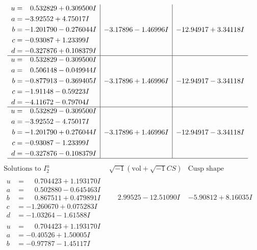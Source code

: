 \documentclass[1p]{elsarticle_modified}
\theoremstyle{definition}
\newcommand{\I}{\sqrt{-1}}
\begin{document}
$$\begin{array}{c|c|c}
\begin{aligned}
u &= \phantom{-}0.532829 + 0.309500 I \\
a &= -3.92552 + 4.75017 I \\
b &= -1.201790 - 0.276044 I \\
c &= -0.93087 + 1.23399 I \\
d &= -0.327876 + 0.108379 I\end{aligned}
 & -3.17896 - 1.46996 I & -12.94917 + 3.34118 I \\ \hline\begin{aligned}
u &= \phantom{-}0.532829 - 0.309500 I \\
a &= \phantom{-}0.506148 - 0.049944 I \\
b &= -0.877913 - 0.369405 I \\
c &= -1.91148 - 0.59223 I \\
d &= -4.11672 - 0.79704 I\end{aligned}
 & -3.17896 + 1.46996 I & -12.94917 - 3.34118 I \\ \hline\begin{aligned}
u &= \phantom{-}0.532829 - 0.309500 I \\
a &= -3.92552 - 4.75017 I \\
b &= -1.201790 + 0.276044 I \\
c &= -0.93087 - 1.23399 I \\
d &= -0.327876 - 0.108379 I\end{aligned}
 & -3.17896 + 1.46996 I & -12.94917 - 3.34118 I\\
 \hline 
 \end{array}$$\newpage$$\begin{array}{c|c|c}  
\text{Solutions to }I^u_{2}& \I (\text{vol} + \sqrt{-1}CS) & \text{Cusp shape}\\
 \hline 
\begin{aligned}
u &= \phantom{-}0.704423 + 1.193170 I \\
a &= \phantom{-}0.502880 - 0.645463 I \\
b &= \phantom{-}0.867511 + 0.479891 I \\
c &= -1.260670 + 0.075283 I \\
d &= -1.03264 - 1.61588 I\end{aligned}
 & \phantom{-}2.99525 - 12.51090 I & -5.90812 + 8.16035 I \\ \hline\begin{aligned}
u &= \phantom{-}0.704423 + 1.193170 I \\
a &= -0.40526 + 1.50005 I \\
b &= -0.97787 - 1.45117 I \\

\end{aligned}
\end{array}$$
\end{document}
